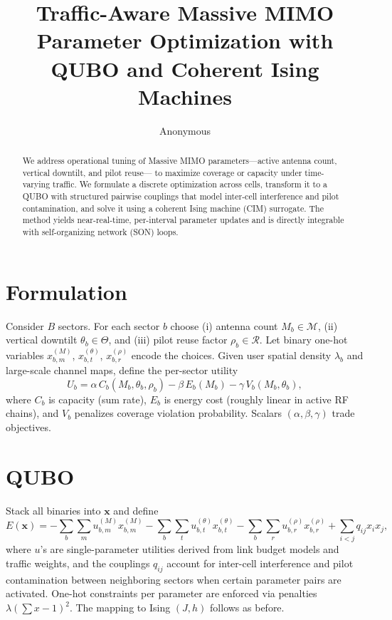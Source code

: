 \documentclass[10pt,conference]{IEEEtran}
\newcommand{\1}{\mathbf{1}}
\begin{document}
\title{Traffic-Aware Massive MIMO Parameter Optimization with QUBO and Coherent Ising Machines}
\author{Anonymous}
\maketitle

\begin{abstract}
We address operational tuning of Massive MIMO parameters---active antenna count, vertical downtilt, and pilot reuse---
to maximize coverage or capacity under time-varying traffic. We formulate a discrete optimization across cells,
transform it to a QUBO with structured pairwise couplings that model inter-cell interference and pilot contamination,
and solve it using a coherent Ising machine (CIM) surrogate. The method yields near-real-time, per-interval parameter
updates and is directly integrable with self-organizing network (SON) loops.
\end{abstract}

\section{Formulation}
Consider $B$ sectors. For each sector $b$ choose
(i) antenna count $M_b\in\mathcal{M}$, (ii) vertical downtilt $\theta_b\in\Theta$, and (iii) pilot reuse factor $\rho_b\in\mathcal{R}$.
Let binary one-hot variables $x^{(M)}_{b,m}$, $x^{(\theta)}_{b,t}$, $x^{(\rho)}_{b,r}$ encode the choices.
Given user spatial density $\lambda_b$ and large-scale channel maps, define
the per-sector utility
\begin{equation}
U_b = \alpha \, C_b(M_b,\theta_b,\rho_b) - \beta \, E_b(M_b) - \gamma \, V_b(M_b,\theta_b),
\end{equation}
where $C_b$ is capacity (sum rate), $E_b$ is energy cost (roughly linear in active RF chains), and $V_b$ penalizes
coverage violation probability. Scalars $(\alpha,\beta,\gamma)$ trade objectives.

\section{QUBO}
Stack all binaries into $\bm{x}$ and define
\begin{equation}
E(\bm{x}) = -\sum_b \sum_m u^{(M)}_{b,m} x^{(M)}_{b,m} - \sum_b \sum_t u^{(\theta)}_{b,t} x^{(\theta)}_{b,t} 
- \sum_b \sum_r u^{(\rho)}_{b,r} x^{(\rho)}_{b,r} + \sum_{i<j} q_{ij} x_i x_j,
\end{equation}
where $u$'s are single-parameter utilities derived from link budget models and traffic weights, and the couplings $q_{ij}$ account for
inter-cell interference and pilot contamination between neighboring sectors when certain parameter pairs are activated.
One-hot constraints per parameter are enforced via penalties $\lambda\left(\sum x -1\right)^2$.
The mapping to Ising $(J,h)$ follows as before.
\end{document}

